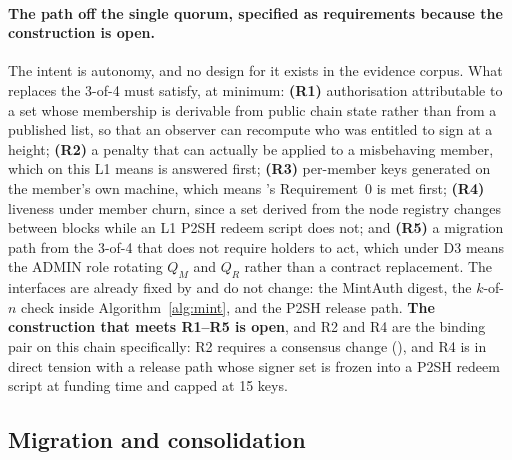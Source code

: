 \paragraph{The path off the single quorum, specified as requirements because the construction is
open.} The intent is autonomy, and no design for it exists in the evidence corpus. What replaces the
3-of-4 must satisfy, at minimum: \textbf{(R1)} authorisation attributable to a set whose membership
is derivable from public chain state rather than from a published list, so that an observer can
recompute who was entitled to sign at a height; \textbf{(R2)} a penalty that can actually be applied
to a misbehaving member, which on this L1 means  is answered first; \textbf{(R3)}
per-member keys generated on the member's own machine, which means 's
Requirement~0 is met first; \textbf{(R4)} liveness under member churn, since a set derived from the
node registry changes between blocks while an L1 P2SH redeem script does not; and \textbf{(R5)} a
migration path from the 3-of-4 that does not require holders to act, which under D3 means the ADMIN
role rotating $Q_M$ and $Q_R$ rather than a contract replacement. The interfaces are already fixed by
 and do not change: the MintAuth digest, the $k$-of-$n$ check inside
Algorithm~\ref{alg:mint}, and the P2SH release path. \textbf{The construction that meets R1--R5 is
open}, and R2 and R4 are the binding pair on this chain specifically: R2 requires a consensus change
(), and R4 is in direct tension with a release path whose signer set is frozen into
a P2SH redeem script at funding time and capped at 15 keys.

\subsection{Migration and consolidation}
\label{sec:bridging-migration}

